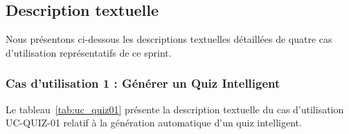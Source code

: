 \subsection{Description textuelle}

Nous présentons ci-dessous les descriptions textuelles détaillées de quatre cas d'utilisation représentatifs de ce sprint.

\subsubsection{Cas d'utilisation 1 : Générer un Quiz Intelligent}

Le tableau~\ref{tab:uc_quiz01} présente la description textuelle du cas d'utilisation UC-QUIZ-01 relatif à la génération automatique d'un quiz intelligent.

